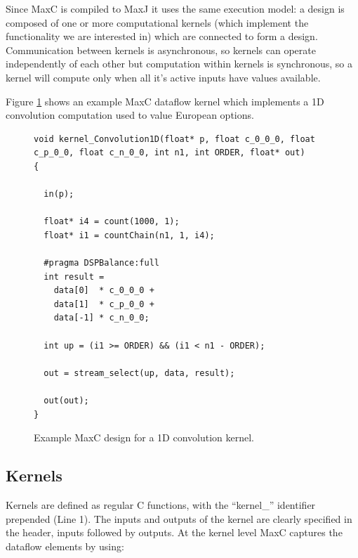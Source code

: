 Since MaxC is compiled to MaxJ it uses the same execution model: a
design is composed of one or more computational kernels (which
implement the functionality we are interested in) which are connected
to form a design. Communication between kernels is asynchronous, so
kernels can operate independently of each other but computation within
kernels is synchronous, so a kernel will compute only when all it's
active inputs have values available.

Figure \ref{fig:maxc-1dconv} shows an example MaxC dataflow kernel
which implements a 1D convolution computation used to value European
options.


\lstset{style=MaxC}

\begin{figure}
\begin{lstlisting}
void kernel_Convolution1D(float* p, float c_0_0_0, float c_p_0_0, float c_n_0_0, int n1, int ORDER, float* out)
{

  in(p);

  float* i4 = count(1000, 1);
  float* i1 = countChain(n1, 1, i4);

  #pragma DSPBalance:full
  int result =
    data[0]  * c_0_0_0 +
    data[1]  * c_p_0_0 +
    data[-1] * c_n_0_0;

  int up = (i1 >= ORDER) && (i1 < n1 - ORDER);

  out = stream_select(up, data, result);

  out(out);
}
\end{lstlisting}
\caption{Example MaxC design for a 1D convolution kernel.}
\label{fig:maxc-1dconv}
\end{figure}

\subsection{Kernels}

Kernels are defined as regular C functions, with the ``kernel\_''
identifier prepended (Line 1). The inputs and outputs of the kernel
are clearly specified in the header, inputs followed by outputs. At
the kernel level MaxC captures the dataflow elements by using:

